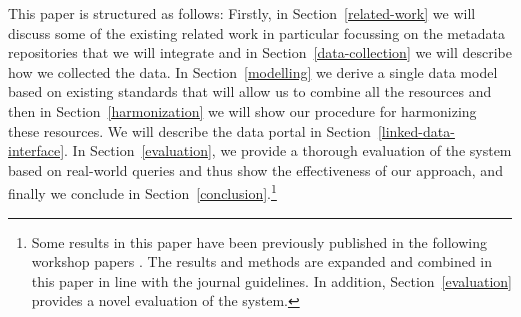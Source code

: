 \documentclass[smallextended]{svjour3}       %
\begin{document}
%
%

This paper is structured as follows: Firstly, in Section~\ref{related-work} we
will discuss some of the existing related work in particular focussing on the
metadata repositories that we will integrate and in
Section~\ref{data-collection} we will describe how we collected the data. In
Section~\ref{modelling} we derive a single data model based on existing
standards that will allow us to combine all the resources and then in
Section~\ref{harmonization} we will show our procedure for harmonizing these
resources. We will describe the data portal in
Section~\ref{linked-data-interface}. In Section~\ref{evaluation}, we provide a
thorough evaluation of the system based on real-world queries and thus show the
effectiveness of our approach, and finally we conclude in
Section~\ref{conclusion}.\footnote{Some results in this paper have been
    previously published in the following workshop papers
    \cite{mccrae2015linghub,mccrae2015reconciling,mccrae2015ontology}. The results
    and methods are expanded and combined in this paper in line with the journal
    guidelines. In addition, Section~\ref{evaluation} provides a novel
evaluation of the system.}
\end{document}
